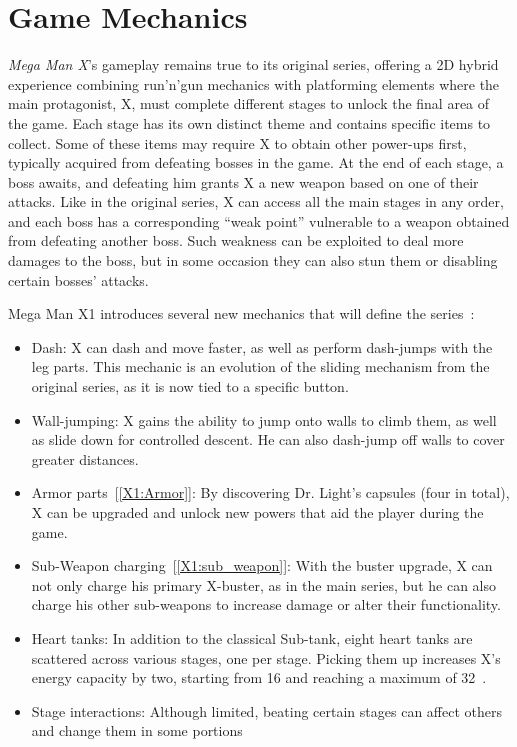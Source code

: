 \section{Game Mechanics}
\textit{Mega Man X}'s gameplay remains true to its original series, offering a 2D hybrid experience combining run'n'gun mechanics with platforming elements where the main protagonist, X, must complete different stages to unlock the final area of the game. Each stage has its own distinct theme and contains specific items to collect. Some of these items may require X to obtain other power-ups first, typically acquired from defeating bosses in the game. At the end of each stage, a boss awaits, and defeating him grants X a new weapon based on one of their attacks. Like in the original series, X can access all the main stages in any order, and each boss has a corresponding ``weak point'' vulnerable to a weapon obtained from defeating another boss. Such weakness can be exploited to deal more damages to the boss, but in some occasion they can also stun them or disabling certain bosses' attacks.

Mega Man X1 introduces several new mechanics that will define the series~\cite{wiki:X1_features}:
\begin{itemize}
	
\item Dash: X can dash and move faster, as well as perform dash-jumps with the leg parts. This mechanic is an evolution of the sliding mechanism from the original series, as it is now tied to a specific button.

\item Wall-jumping: X gains the ability to jump onto walls to climb them, as well as slide down for controlled descent. He can also dash-jump off walls to cover greater distances.

\item Armor parts~[\ref{X1:Armor}]: By discovering Dr. Light's capsules (four in total), X can be upgraded and unlock new powers that aid the player during the game.

\item Sub-Weapon charging~[\ref{X1:sub_weapon}]: With the buster upgrade, X can not only charge his primary X-buster, as in the main series, but he can also charge his other sub-weapons to increase damage or alter their functionality.

\item Heart tanks: In addition to the classical Sub-tank, eight heart tanks are scattered across various stages, one per stage. Picking them up increases X's energy capacity by two, starting from 16 and reaching a maximum of 32~\cite{stratwiki:Heart_tank}.

\item Stage interactions: Although limited, beating certain stages can affect others and change them in some portions
\end{itemize}

